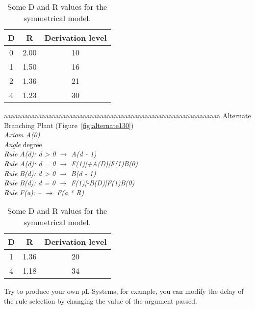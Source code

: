 \begin{table}
\begin{center}
\begin{tabular}{|c|c|c|}\hline 
\textbf{D} &\textbf{R}& \textbf{Derivation level}\\ \hline
0& 2.00& 10\\ \hline 
1& 1.50& 16\\ \hline
2& 1.36& 21\\ \hline 
4& 1.23& 30\\ \hline 
\end{tabular}
\end{center}
\caption{Some  D and R values for the symmetrical model.}\label{tab:sym}
\end{table}


\begin{tabbing}
\=aaa\=aaa\=aaa\=aaaaaaaaa\=aaaaaaaaa\=aaaaaaaaa\=aaaaaaaaa\=aaaaaaaaa\=aaaaaaaaa\kill
Alternate Branching Plant (Figure~\ref{fig:alternate130})\\
\>\>\> \emph{Axiom} \>\>\emph{A(0)}\\
\>\>\> \emph{Angle} \> degree\\
\>\>\> \emph{Rule}  \>\>\emph{A(d): d > 0 $\rightarrow$ A(d - 1)}\\
\>\>\> \emph{Rule}  \>\>\emph{A(d): d = 0 $\rightarrow$ F(1)[+A(D)]F(1)B(0)}\\
\>\>\> \emph{Rule}  \>\>\emph{B(d): d > 0 $\rightarrow$ B(d - 1)}\\
\>\>\> \emph{Rule}  \>\>\emph{B(d): d = 0 $\rightarrow$ F(1)[-B(D)]F(1)B(0)}\\
\>\>\> \emph{Rule}  \>\>\emph{F(a): -- $\rightarrow$ F(a * R)}
\end{tabbing}

\begin{table}
\begin{center}
\begin{tabular}{|c|c|c|}\hline 
\textbf{D} &\textbf{R}& \textbf{Derivation level}\\ \hline
1& 1.36& 20\\ \hline
4& 1.18& 34\\ \hline
\end{tabular}
\end{center}
\caption{Some  D and R values for the symmetrical model.}\label{tab:asym}
\end{table}


Try to produce your own pL-Systems, for example, you can modify the delay
of the rule selection by changing the value of the argument passed. 







